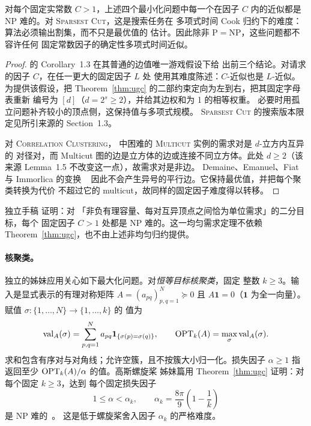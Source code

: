 \begin{corollary}[割、删除与聚类难度]
\label{cor:cut-clustering}
对每个固定实常数 \(C>1\)，上述四个最小化问题中每一个在因子 \(C\)
内的近似都是 NP 难的。对 \textsc{Sparsest Cut}，这是搜索任务在
多项式时间 Cook 归约下的难度：算法必须输出割集，而不只是最优值的
估计。因此除非 \(\mathrm P=\mathrm{NP}\)，这些问题都不容许任何
固定常数因子的确定性多项式时间近似。
\end{corollary}
\begin{proof}
\cite{CKKRS2006} 的 Corollary~1.3 在其普通的边值唯一游戏假设下给
出前三个结论。对请求的因子 \(C\)，在任一更大的固定因子 \(L\) 处
使用其难度陈述：\(C\)-近似也是 \(L\)-近似。为提供该假设，把
Theorem~\ref{thm:ugc} 的二部约束定向为左到右，把其固定字母表重新
编号为 \([d]\)（\(d=2^s\ge2\)），并给其边权和为 1 的相等权重。
必要时用孤立问题补齐较小的顶点侧，这保持值与多项式规模。
\textsc{Sparsest Cut} 的搜索版本限定见所引来源的 Section~1.3。

对 \textsc{Correlation Clustering}，\cite[Section~2.1]{CKKRS2006}
中困难的 \textsc{Multicut} 实例的需求对是 \(d\)-立方内互异的
对径对，而 Multicut 图的边是立方体的边或连接不同立方体。此处
\(d\ge2\)（该来源 Lemma~1.5 不改变这一点），故需求对是非边。
Demaine、Emanuel、Fiat 与 Immorlica 的变换
~\cite[Theorem~4.7 and Corollary~4.8]{DemaineEtAl2006Clustering}
因此不会产生异号的平行边。它保持最优值，并把每个聚类转换为代价
不超过它的 multicut，故同样的固定因子难度得以转移。
\end{proof}

独立手稿 \cite[Theorem~1.1]{OpenAIUniformSparsest2026} 证明：对
「非负有理容量、每对互异顶点之间恰为单位需求」的二分目标，每个
固定因子 \(C>1\) 处都是 NP 难的。这一均匀需求定理不依赖
Theorem~\ref{thm:ugc}，也不由上述非均匀归约提供。

\paragraph{核聚类。}
独立的姊妹应用关心如下最大化问题。对\emph{恒等目标核聚类}，固定
整数 \(k\ge3\)。输入是显式表示的有理对称矩阵
\(A=(a_{pq})_{p,q=1}^N\succeq0\) 且 \(A\mathbf1=0\)（\(\mathbf1\)
为全一向量）。赋值 \(\sigma:\{1,\ldots,N\}\to\{1,\ldots,k\}\) 的
值为
\[
 \operatorname{val}_A(\sigma)=\sum_{p,q=1}^N
 a_{pq}\mathbf1_{\{\sigma(p)=\sigma(q)\}},
 \qquad
 \operatorname{OPT}_k(A)=\max_\sigma\operatorname{val}_A(\sigma).
\]
求和包含有序对与对角线；允许空簇，且不按簇大小归一化。损失因子
\(\alpha\ge1\) 指返回至少 \(\operatorname{OPT}_k(A)/\alpha\) 的值。高斯螺旋桨
姊妹篇用 Theorem~\ref{thm:ugc} 证明：对每个固定 \(k\ge3\)，达到
每个固定损失因子
\[
 1\le\alpha<\alpha_k,
 \qquad \alpha_k=\frac{8\pi}{9}\left(1-\frac1k\right)
\]
是 NP 难的~\cite[Theorem~6.1]{OpenAIGaussianPropeller2026}。
这是低于螺旋桨舍入因子 \(\alpha_k\) 的严格难度。
